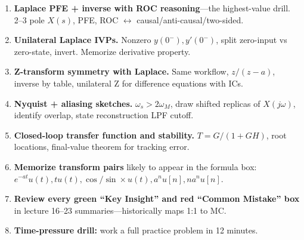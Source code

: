 \documentclass[11pt]{article}
\begin{document}
\begin{enumerate}[leftmargin=*]
    \item \textbf{Laplace PFE + inverse with ROC reasoning}---the highest-value drill. 2--3 pole $X(s)$, PFE, ROC $\leftrightarrow$ causal/anti-causal/two-sided.
    \item \textbf{Unilateral Laplace IVPs.} Nonzero $y(0^-), y'(0^-)$, split zero-input vs zero-state, invert. Memorize derivative property.
    \item \textbf{Z-transform symmetry with Laplace.} Same workflow, $z/(z-a)$, inverse by table, unilateral Z for difference equations with ICs.
    \item \textbf{Nyquist + aliasing sketches.} $\omega_s>2\omega_M$, draw shifted replicas of $X(j\omega)$, identify overlap, state reconstruction LPF cutoff.
    \item \textbf{Closed-loop transfer function and stability.} $T=G/(1+GH)$, root locations, final-value theorem for tracking error.
    \item \textbf{Memorize transform pairs} likely to appear in the formula box: $e^{-at}u(t), tu(t), \cos/\sin\times u(t), a^n u[n], n a^n u[n]$.
    \item \textbf{Review every green ``Key Insight'' and red ``Common Mistake'' box} in lecture 16--23 summaries---historically maps 1:1 to MC.
    \item \textbf{Time-pressure drill:} work a full practice problem in 12 minutes.
\end{enumerate}
\end{document}
